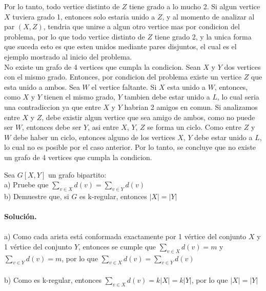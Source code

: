 \documentclass[12pt]{article}
\newenvironment{ejercicio}[2][Ejercicio]{\begin{trivlist}
\item[\hskip \labelsep {\bfseries #1}\hskip \labelsep {\bfseries #2.}]}{\end{trivlist}}
\begin{document}
Por lo tanto, todo vertice distinto de $Z$ tiene grado a lo mucho 2. Si algun vertice $X$ tuviera grado 1, entonces solo estaria unido a $Z$, y al momento de analizar al par $(X,Z)$, tendria que unirse a algun otro vertice mas por condicion del problema, por lo que todo vertice distinto de $Z$ tiene grado 2, y la unica forma que suceda esto es que esten unidos mediante pares disjuntos, el cual es el ejemplo mostrado al inicio del problema.
\\
No existe un grafo de 4 vertices que cumpla la condicion. Sean $X$ y $Y$ dos vertices con el mismo grado. Entonces, por condicion del problema existe un vertice $Z$ que esta unido a ambos.
Sea $W$ el vertice faltante. Si $X$ esta unido a $W$, entonces, como $X$ y $Y$ tienen el mismo grado, $Y$ tambien debe estar unido a $L$, lo cual seria una contradiccion ya que entre $X$ y $Y$ habrian 2 amigos en comun. Si analizamos entre $X$ y $Z$, debe existir algun vertice que sea amigo de ambos, como no puede ser $W$, entonces debe ser $Y$, asi entre $X$, $Y$, $Z$ se forma un ciclo. Como entre $Z$ y $W$ debe haber un ciclo, entonces alguno de los vertices $X$, $Y$ debe estar unido a $L$, lo cual no es posible por el caso anterior. Por lo tanto, se concluye que no existe un grafo de 4 vertices que cumpla la condicion.

\begin{ejercicio}{1.1.9}
\end{ejercicio}
Sea $G[X,Y]$ un grafo bipartito:
\\
a) Pruebe que $\sum_{v \in X}^{}d(v) = \sum_{v \in Y}^{}d(v)$ 
\\
b) Demuestre que, si $G$ es k-regular, entonces $\vert X \vert = \vert Y \vert$
\\\\
\textbf{Solución.} 
\\\\
a) Como cada arista está conformada exactamente por 1 vértice del conjunto $X$ y 1 vértice del conjunto $Y$, entonces se cumple que $\sum_{v \in X}^{}d(v) = m$ y $\sum_{v \in Y}^{}d(v) = m$, por lo que 
$\sum_{v \in X}^{}d(v) = \sum_{v \in Y}^{}d(v)$
\\\\
b) Como es k-regular, entonces $\sum_{v \in X}^{}d(v) = k\vert X \vert = k\vert Y \vert$, por lo que $\vert X \vert = \vert Y \vert$
\end{document}
